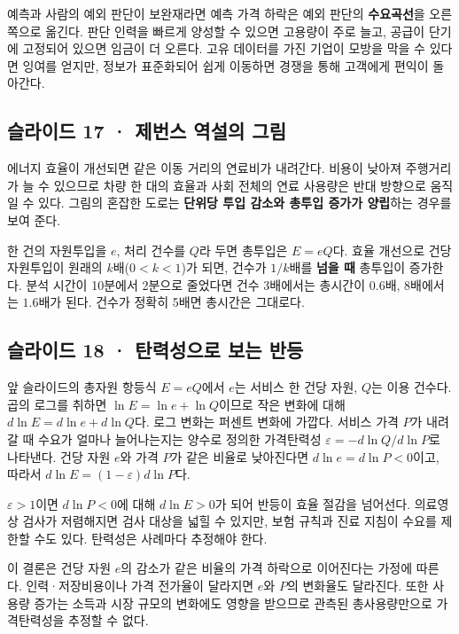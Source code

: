 \documentclass[11pt,a4paper]{article}
\begin{document}
예측과 사람의 예외 판단이 보완재라면 예측 가격 하락은 예외 판단의 \textbf{수요곡선}을 오른쪽으로 옮긴다. 판단 인력을 빠르게 양성할 수 있으면 고용량이 주로 늘고, 공급이 단기에 고정되어 있으면 임금이 더 오른다. 고유 데이터를 가진 기업이 모방을 막을 수 있다면 잉여를 얻지만, 정보가 표준화되어 쉽게 이동하면 경쟁을 통해 고객에게 편익이 돌아간다.\par

\subsection{슬라이드 17 · 제번스 역설의 그림}
에너지 효율이 개선되면 같은 이동 거리의 연료비가 내려간다. 비용이 낮아져 주행거리가 늘 수 있으므로 차량 한 대의 효율과 사회 전체의 연료 사용량은 반대 방향으로 움직일 수 있다. 그림의 혼잡한 도로는 \textbf{단위당 투입 감소와 총투입 증가가 양립}하는 경우를 보여 준다.\par

한 건의 자원투입을 $e$, 처리 건수를 $Q$라 두면 총투입은 $E=eQ$다. 효율 개선으로 건당 자원투입이 원래의 $k$배($0<k<1$)가 되면, 건수가 $1/k$배를 \textbf{넘을 때} 총투입이 증가한다. 분석 시간이 10분에서 2분으로 줄었다면 건수 3배에서는 총시간이 $0.6$배, 8배에서는 $1.6$배가 된다. 건수가 정확히 5배면 총시간은 그대로다.\par

\subsection{슬라이드 18 · 탄력성으로 보는 반등}
앞 슬라이드의 총자원 항등식 $E=eQ$에서 $e$는 서비스 한 건당 자원, $Q$는 이용 건수다. 곱의 로그를 취하면 $\ln E=\ln e+\ln Q$이므로 작은 변화에 대해 $d\ln E=d\ln e+d\ln Q$다. 로그 변화는 퍼센트 변화에 가깝다. 서비스 가격 $P$가 내려갈 때 수요가 얼마나 늘어나는지는 양수로 정의한 가격탄력성 $\varepsilon=-d\ln Q/d\ln P$로 나타낸다. 건당 자원 $e$와 가격 $P$가 같은 비율로 낮아진다면 $d\ln e=d\ln P<0$이고, 따라서 $d\ln E=(1-\varepsilon)d\ln P$다.\par

$\varepsilon>1$이면 $d\ln P<0$에 대해 $d\ln E>0$가 되어 반등이 효율 절감을 넘어선다. 의료영상 검사가 저렴해지면 검사 대상을 넓힐 수 있지만, 보험 규칙과 진료 지침이 수요를 제한할 수도 있다. 탄력성은 사례마다 추정해야 한다.\par

이 결론은 건당 자원 $e$의 감소가 같은 비율의 가격 하락으로 이어진다는 가정에 따른다. 인력·저장비용이나 가격 전가율이 달라지면 $e$와 $P$의 변화율도 달라진다. 또한 사용량 증가는 소득과 시장 규모의 변화에도 영향을 받으므로 관측된 총사용량만으로 가격탄력성을 추정할 수 없다.\par
\end{document}
